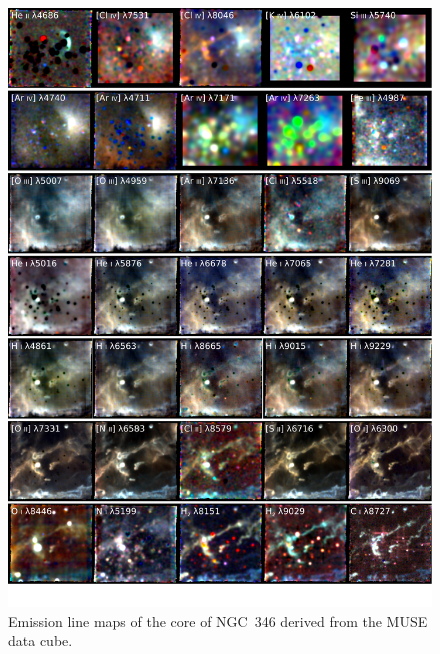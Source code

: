 \documentclass[useAMS, usenatbib, a4paper]{mnras}
\begin{document}
\begin{figure}
  \centering
  \includegraphics[width=\linewidth]{figs/ngc346-ZZ-multi-map-annotated}
  \caption{
    Emission line maps of the core of NGC~346 derived from the MUSE data cube.
  }
  \label{fig:ngc346-ZZ-multimap}
\end{figure}
\end{document}
